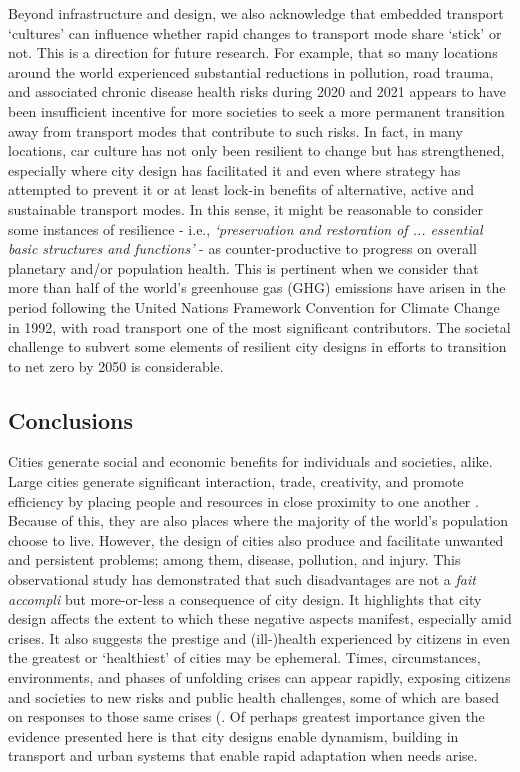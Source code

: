 \documentclass[preprint,10pt]{elsarticle} %
\begin{document}
Beyond infrastructure and design, we also acknowledge that embedded transport `cultures' \cite{PATERSON_2000} can influence whether rapid changes to transport mode share `stick' or not. This is a direction for future research. For example, that so many locations around the world experienced substantial reductions in pollution, road trauma, and associated chronic disease health risks during 2020 and 2021 appears to have been insufficient incentive for more societies to seek a more permanent transition away from transport modes that contribute to such risks. In fact, in many locations, car culture has not only been resilient to change but has strengthened, especially where city design has facilitated it and even where strategy has attempted to prevent it or at least lock-in benefits of alternative, active and sustainable transport modes\cite{hunter_city_2024}. In this sense, it might be reasonable to consider some instances of resilience - i.e., \textit{`preservation and restoration of ... essential basic structures and functions'} - as counter-productive to progress on overall planetary and/or population health. This is pertinent when we consider that more than half of the world's greenhouse gas (GHG) emissions have arisen in the period following the United Nations Framework Convention for Climate Change in 1992\cite{bashmakov2022climate}, with road transport one of the most significant contributors. The societal challenge to subvert some elements of resilient city designs in efforts to transition to net zero by 2050\cite{lynskey2020moving} is considerable.

\subsection*{Conclusions}

Cities generate social and economic benefits for individuals and societies, alike. Large cities generate significant interaction, trade, creativity, and promote efficiency by placing people and resources in close proximity to one another \cite{bettencourt2013origins}. Because of this, they are also places where the majority of the world's population choose to live. However, the design of cities also produce and facilitate unwanted and persistent problems; among them, disease, pollution, and injury. This observational study has demonstrated that such disadvantages are not a \textit{fait accompli} but more-or-less a consequence of city design. It highlights that city design affects the extent to which these negative aspects manifest, especially amid crises. It also suggests the prestige and (ill-)health experienced by citizens in even the greatest or `healthiest' of cities may be ephemeral. Times, circumstances, environments, and phases of unfolding crises can appear rapidly, exposing citizens and societies to new risks and public health challenges, some of which are based on responses to those same crises (\cite{hunter_city_2024, garcia_city_2024}. Of perhaps greatest importance given the evidence presented here is that city designs enable dynamism, building in transport and urban systems that enable rapid adaptation when needs arise.
\end{document}
